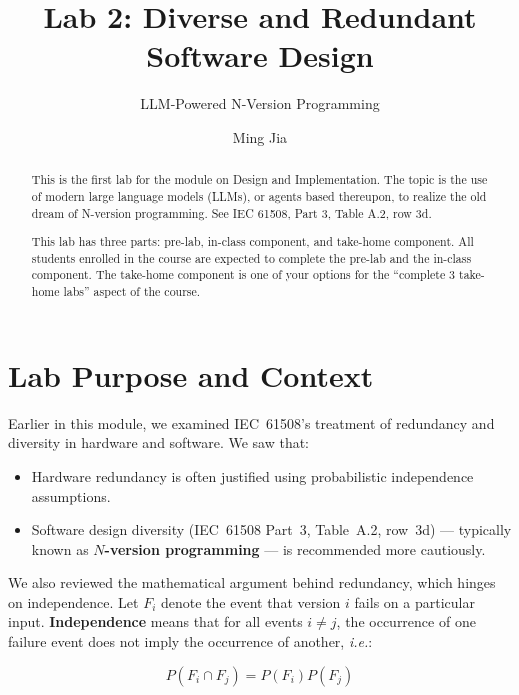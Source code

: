 \documentclass[manuscript,screen,nonacm]{acmart}
\title{Lab 2: Diverse and Redundant Software Design}
\subtitle{LLM-Powered N-Version Programming}
\makeatletter
\newcommand{\ie}{\textit{i.e.}\@\xspace}
\makeatother
\begin{document}
\author{Ming Jia}

\renewcommand{\shortauthors}{Ming Jia}


\begin{abstract}
This is the first lab for the module on Design and Implementation.
The topic is the use of modern large language models (LLMs), or agents based thereupon, to realize the old dream of N-version programming.
See IEC 61508, Part 3, Table A.2, row 3d.

This lab has three parts:
  pre-lab,
  in-class component,
  and take-home component.
All students enrolled in the course are expected to complete the pre-lab and the in-class component.
The take-home component is one of your options for the ``complete 3 take-home labs'' aspect of the course.
\end{abstract}

\maketitle

\section{Lab Purpose and Context}

Earlier in this module, we examined IEC~61508’s treatment of redundancy and diversity in hardware and software. 
We saw that:

\begin{itemize}
  \item Hardware redundancy is often justified using probabilistic independence assumptions.
  \item Software design diversity (IEC~61508 Part~3, Table~A.2, row~3d) --- typically known as \textbf{$N$-version programming} --- is recommended more cautiously.
\end{itemize}

We also reviewed the mathematical argument behind redundancy, which hinges on independence.
Let $F_i$ denote the event that version $i$ fails on a particular input.
\textbf{Independence} means that for all events $i \neq j$, the occurrence of one failure event does not imply the occurrence of another, \ie:

\[
P(F_i \cap F_j) = P(F_i) P(F_j)
\]
\end{document}
